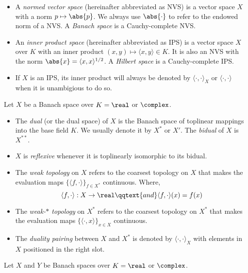 \documentclass[../main-v2-manifolds.tex]{subfiles}
\begin{document}
\begin{itemize}
    \item A \emph{normed vector space} (hereinafter abbreviated as NVS) is a vector space $X$ with a norm $p\mapsto \abs{p}$. We always use $\abs{\cdot}$ to refer to the endowed norm of a NVS. A \emph{Banach space} is a Cauchy-complete NVS.
    \item An \emph{inner product space} (hereinafter abbreviated as IPS) is a vector space $X$ over $K$ with an inner product $(x,y)\mapsto \langle x,y\rangle\in K$. It is also an NVS with the norm $\abs{x}=\langle x,x\rangle^{1/2}$. A \emph{Hilbert space} is a Cauchy-complete IPS.
    \item If $X$ is an IPS, its inner product will always be denoted by $\langle \cdot,\cdot\rangle_{X}$ or $\langle \cdot,\cdot\rangle$ when it is unambigious to do so.
\end{itemize}
Let $X$ be a Banach space over $K = \real$ or $\complex$.
\begin{itemize}
    \item The \emph{dual} (or the dual space) of $X$ is the Banach space of toplinear mappings into the base field $K$. We usually denote it by $X^*$ or $X'$. The \emph{bidual} of $X$ is $X^{**}$.
    \item $X$ is \emph{reflexive} whenever it is toplinearly isomorphic to its bidual.
    \item The \emph{weak topology} on $X$ refers to the coarsest topology on $X$ that makes the evaluation maps $\{\langle f,\cdot\rangle\}_{f\in X^*}$ continuous. Where,
    \[
        \langle f,\cdot\rangle: X\to\real\qqtext{and}\langle f,\cdot\rangle(x) = f(x)
    \]
    \item The \emph{weak-$\ast$ topology} on $X^*$ refers to the coarsest topology on $X^*$ that makes the evaluation maps $\{\langle\cdot, x\rangle\}_{x\in X}$ continuous.
    \item The \emph{duality pairing} between $X$ and $X^*$ is denoted by $\langle \cdot,\cdot\rangle_{X}$ with elements in $X$  positioned in the right slot.
\end{itemize}
Let $X$ and $Y$ be Banach spaces over $K = \real$ or $\complex$.
\end{document}
